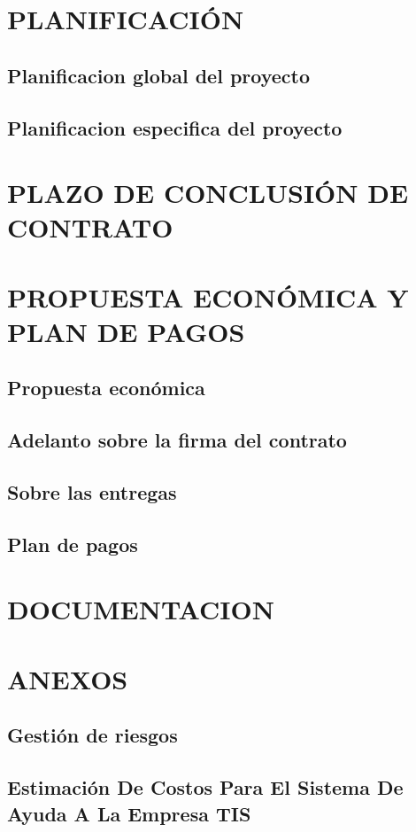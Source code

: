 \documentclass[11pt,letterpaper]{report}
\begin{document}
\chapter{PLANIFICACIÓN}
\section{Planificacion global del proyecto}
\section{Planificacion especifica del proyecto}


\chapter{PLAZO DE CONCLUSIÓN DE CONTRATO}


\chapter{PROPUESTA ECONÓMICA Y PLAN DE PAGOS}

\section{Propuesta económica}
\section{Adelanto sobre la firma del contrato}
\section{Sobre las entregas}
\section{Plan de pagos}

\chapter{DOCUMENTACION}

\chapter{ANEXOS}
\section{Gestión de riesgos}
\section{Estimación De Costos Para El Sistema De Ayuda A La Empresa TIS}
\end{document}
